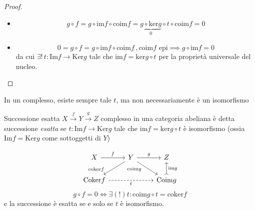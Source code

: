\begin{proof}\( \)
\begin{itemize}
    \item[\(\impliedby \)]
    \[
        g \circ f = g \circ \mathrm{im}f \circ \mathrm{coim}f = \underbrace{g \circ \mathrm{ker}g}_0 \circ t \circ \mathrm{coim}f = 0
    \]
    \item[\(\implies \)] \[
      0 = g \circ f = g \circ \mathrm{im}f \circ \mathrm{coim}f \,, \mathrm{coim}f \text{ epi} \implies g \circ \mathrm{im}f = 0
    \]
    da cui \(\exists ! \, t : \mathrm{Im}f \to \mathrm{Ker}g\) tale che
    \(\mathrm{im}f = \mathrm{ker}g \circ t\) per la proprietà universale del
    nucleo.
\end{itemize}
\end{proof}
\begin{remark}{}
    In un complesso, esiste sempre tale \(t\), ma non necessariamente è un
    isomorfismo
\end{remark}

\begin{definition}{Successione esatta}
    \(X \overset{f}{\to } Y \overset{g}{\to } Z\) complesso in una categoria
    abeliana è detta successione \emph{esatta} se \(t : \mathrm{Im}f \to \mathrm{Ker}g \) tale che
    \(\mathrm{im}f = \mathrm{ker}g \circ t\) è isomorfismo (ossia \(\mathrm{Im}f = \mathrm{Ker}g\) come sottoggetti di \(Y\))
\end{definition}

\begin{remark}{}
\[\begin{tikzcd}
	X & Y & Z \\
	{\mathrm{Coker}f} && {\mathrm{Coim}g}
	\arrow["f", from=1-1, to=1-2]
	\arrow["g", from=1-2, to=1-3]
	\arrow["{\mathrm{coker}f}"'{pos=0.9}, from=1-2, to=2-1]
	\arrow["{\mathrm{coim}g}"'{pos=0.3}, from=1-2, to=2-3]
	\arrow["t"', dashed, from=2-1, to=2-3]
	\arrow["{\mathrm{im}g}"', tail, from=2-3, to=1-3]
\end{tikzcd}\]
   \[
     g \circ f = 0 \iff \exists (!) t : \mathrm{coim}g \circ t = \mathrm{coker}f
   \] %
   e la successione è esatta se e solo se \(
   t\) è isomorfismo.
\end{remark}

